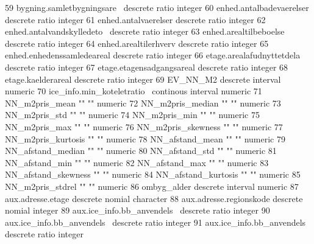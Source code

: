 \documentclass{report}
\begin{document}
\begin{Schunk}
\begin{Soutput}
 59 bygning.samletbygningsare~ descrete         ratio           integer         
 60 enhed.antalbadevaerelser   descrete         ratio           integer         
 61 enhed.antalvaerelser       descrete         ratio           integer         
 62 enhed.antalvandskylledeto~ descrete         ratio           integer         
 63 enhed.arealtilbeboelse     descrete         ratio           integer         
 64 enhed.arealtilerhverv      descrete         ratio           integer         
 65 enhed.enhedenssamledeareal descrete         ratio           integer         
 66 etage.arealafudnyttetdela~ descrete         ratio           integer         
 67 etage.etagensadgangsareal  descrete         ratio           integer         
 68 etage.kaelderareal         descrete         ratio           integer         
 69 EV_NN_M2                   descrete         interval        numeric         
 70 ice_info.min_koteletratio~ continous        interval        numeric         
 71 NN_m2pris_mean             ""               ""              numeric         
 72 NN_m2pris_median           ""               ""              numeric         
 73 NN_m2pris_std              ""               ""              numeric         
 74 NN_m2pris_min              ""               ""              numeric         
 75 NN_m2pris_max              ""               ""              numeric         
 76 NN_m2pris_skewness         ""               ""              numeric         
 77 NN_m2pris_kurtosis         ""               ""              numeric         
 78 NN_afstand_mean            ""               ""              numeric         
 79 NN_afstand_median          ""               ""              numeric         
 80 NN_afstand_std             ""               ""              numeric         
 81 NN_afstand_min             ""               ""              numeric         
 82 NN_afstand_max             ""               ""              numeric         
 83 NN_afstand_skewness        ""               ""              numeric         
 84 NN_afstand_kurtosis        ""               ""              numeric         
 85 NN_m2pris_stdrel           ""               ""              numeric         
 86 ombyg_alder                descrete         interval        numeric         
 87 aux.adresse.etage          descrete         nomial          character       
 88 aux.adresse.regionskode    descrete         nomial          integer         
 89 aux.ice_info.bb_anvendels~ descrete         ratio           integer         
 90 aux.ice_info.bb_anvendels~ descrete         ratio           integer         
 91 aux.ice_info.bb_anvendels~ descrete         ratio           integer         

\end{Soutput}
\end{Schunk}
\end{document}
